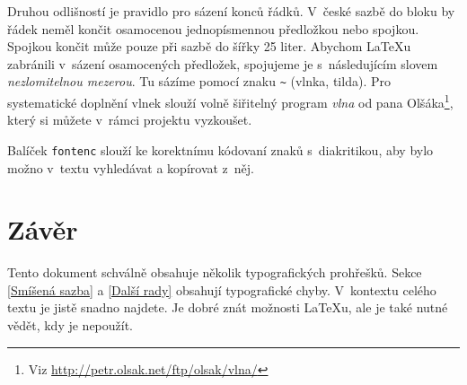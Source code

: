 \documentclass[a4paper, 10pt, twocolumn]{article}
\begin{document}
Druhou odlišností je pravidlo pro sázení konců řádků.
V~české sazbě do bloku by řádek neměl končit osamocenou jednopísmennou předložkou nebo spojkou.
Spojkou  končit může pouze při sazbě do šířky 25 liter.
Abychom \LaTeX u zabránili v~sázení osamocených předložek, spojujeme je s~následujícím slovem \emph{nezlomitelnou mezerou}.
Tu sázíme pomocí znaku \verb|~| (vlnka, tilda).
Pro systematické doplnění vlnek slouží volně šiřitelný program \emph{vlna} od pana Olšáka\footnote[2]{Viz \url{http://petr.olsak.net/ftp/olsak/vlna/}}, který si můžete v~rámci projektu vyzkoušet.

Balíček \texttt{fontenc} slouží ke korektnímu kódovaní znaků s~diakritikou, aby bylo možno v~textu vyhledávat a kopírovat z~něj.


\section{Závěr}
Tento dokument schválně obsahuje několik typografických prohřešků.
Sekce \ref{Smíšená sazba} a \ref{Další rady} obsahují typografické chyby.
V~kontextu celého textu je jistě snadno najdete.
Je dobré znát možnosti \LaTeX u, ale je také nutné vědět, kdy je nepoužít.
\end{document}
